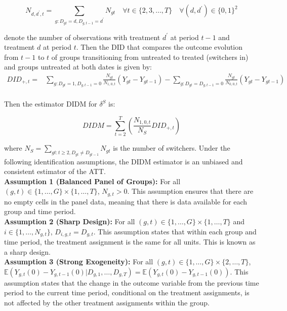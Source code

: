 \documentclass[10pt, oneside]{book}
\begin{document}
\begin{equation*}
    N_{d,d^{'},t} = \sum_{g:D_{gt}=d, D_{g,t-1} = d^{'}} N_{gt} \quad \forall t \in \{2, 3, \dots, T\} \quad \forall (d, d^{'}) \in \{0,1\}^2
\end{equation*}

denote the number of observations with treatment $d^{'}$ at period $t-1$ and treatment $d$ at period $t$. Then the DID that compares the outcome evolution from $t-1$ to $t$ of groups transitioning from untreated to treated (switchers in) and groups untreated at both dates is given by:
\begin{align*}
    DID_{+,t} = & \sum_{g:D_{gt}=1, D_{g,t-1} = 0} \frac{N_{gt}}{N_{1,0,t}} (Y_{gt} - Y_{gt-1}) - \sum_{g:D_{gt}=D_{g,t-1}=0} \frac{N_{gt}}{N_{0,0,t}} (Y_{gt} - Y_{gt-1}) \\
\end{align*}

Then the estimator DIDM for $\delta^{S}$ is:

\begin{equation*}
    DIDM = \sum_{t = 2}^T \left(\frac{N_{1,0,t}}{N_{S}} DID_{+,t}\right)
\end{equation*}

where $N_{S} = \sum_{gt: t\geq2, D_{gt}\neq D_{gt-1}} N_{gt}$ is the number of switchers. Under the following identification assumptions, the DIDM estimator is an unbiased and consistent estimator of the ATT. \\

\textbf{Assumption 1 (Balanced Panel of Groups):} For all $(g,t) \in \{1, \ldots, G\} \times \{1, \ldots, T\}$, $N_{g,t} > 0$. This assumption ensures that there are no empty cells in the panel data, meaning that there is data available for each group and time period. \\

\textbf{Assumption 2 (Sharp Design):} For all $(g,t) \in \{1, \ldots, G\} \times \{1, \ldots, T\}$ and $i \in \{1, \ldots, N_{g,t}\}$, $D_{i,g,t} = D_{g,t}$. This assumption states that within each group and time period, the treatment assignment is the same for all units. This is known as a sharp design. \\

\textbf{Assumption 3 (Strong Exogeneity):} For all $(g,t) \in \{1, \ldots, G\} \times \{2, \ldots, T\}$, $\mathbb{E}(Y_{g,t}(0) - Y_{g,t-1}(0) | D_{g,1}, \ldots, D_{g,T}) = \mathbb{E}(Y_{g,t}(0) - Y_{g,t-1}(0))$. This assumption states that the change in the outcome variable from the previous time period to the current time period, conditional on the treatment assignments, is not affected by the other treatment assignments within the group. \\
\end{document}
